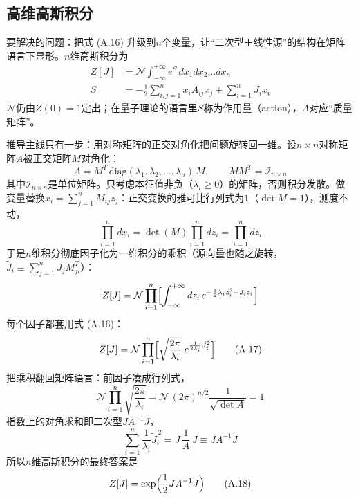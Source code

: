 \subsection{高维高斯积分}

要解决的问题：把式 (A.16) 升级到$n$个变量，让“二次型＋线性源”的结构在矩阵语言下显形。$n$维高斯积分为
\begin{align*}
Z[J]&=\mathcal{N}\int_{-\infty}^{+\infty}e^{S}\,
dx_1 dx_2 \ldots dx_n\\
S&=-\frac{1}{2}\sum_{i,j=1}^{n}x_i A_{ij}x_j+\sum_{i=1}^{n}J_i x_i
\end{align*}
$\mathcal{N}$仍由$Z(0)=1$定出；在量子理论的语言里$S$称为作用量（action），$A$对应“质量矩阵”。

推导主线只有一步：用对称矩阵的正交对角化把问题旋转回一维。设$n\times n$对称矩阵$A$被正交矩阵$M$对角化：
\begin{equation*}
A=M^T\,\mathrm{diag}(\lambda_1,\lambda_2,\ldots,\lambda_n)\,M,
\qquad
MM^T=\mathcal{I}_{n\times n}
\end{equation*}
其中$\mathcal{I}_{n\times n}$是单位矩阵。只考虑本征值非负（$\lambda_i\ge 0$）的矩阵，否则积分发散。做变量替换$x_i=\sum_{j=1}^n M_{ij}z_j$：正交变换的雅可比行列式为$1$（$\det M=1$），测度不动，
\begin{equation*}
\prod_{i=1}^{n}dx_i=\det(M)\prod_{i=1}^{n}dz_i=\prod_{i=1}^{n}dz_i
\end{equation*}
于是$n$维积分彻底因子化为一维积分的乘积（源向量也随之旋转，$\tilde{J}_i\equiv\sum_{j=1}^{n}J_j M^T_{ji}$）：
\begin{equation*}
Z[J]=\mathcal{N}\prod_{i=1}^{n}
\Bigl[\int_{-\infty}^{+\infty}
dz_i\,e^{-\frac{1}{2}\lambda_i z_i^2+\tilde{J}_i z_i}\Bigr]
\end{equation*}
每个因子都套用式 (A.16)：
\begin{equation*}
Z[J]=\mathcal{N}\prod_{i=1}^{n}
\Bigl[\sqrt{\frac{2\pi}{\lambda_i}}\;
e^{\frac{1}{2\lambda_i}\tilde{J}_i^2}\Bigr]
\tag{A.17}
\end{equation*}
把乘积翻回矩阵语言：前因子凑成行列式，
\begin{equation*}
\mathcal{N}\prod_{i=1}^{n}\sqrt{\frac{2\pi}{\lambda_i}}
=\mathcal{N}\,(2\pi)^{n/2}\frac{1}{\sqrt{\det A}}=1
\end{equation*}
指数上的对角求和即二次型$J A^{-1}J$，
\begin{equation*}
\sum_{i=1}^{n}\frac{1}{\lambda_i}\tilde{J}_i^{\,2}
=J\,\frac{1}{A}\,J\equiv J A^{-1}J
\end{equation*}
所以$n$维高斯积分的最终答案是
\begin{equation*}
Z[J]=\exp\Bigl(\frac{1}{2}J A^{-1}J\Bigr)
\tag{A.18}
\end{equation*}

